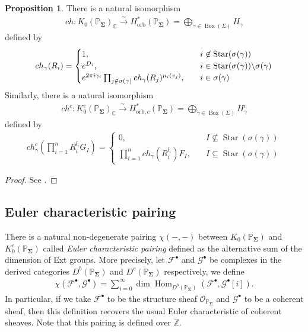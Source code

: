 \documentclass[11pt,reqno]{amsart}
\def\CC {{\mathbb C}}
\def\Z {{\mathbb Z}}
\def\PP {{\mathbb P}}
\theoremstyle{definition}
\newtheorem{proposition}[theorem]{Proposition}
\numberwithin{equation}{section}
\begin{document}
\smallskip



\begin{proposition}
	There is a natural isomorphism
	\begin{align*}
		ch: K_0(\PP_{\mathbf{\Sigma}})_{\CC}\xrightarrow{\sim} H_{\mathrm{orb}}^*(\PP_{\mathbf{\Sigma}})=\bigoplus_{\gamma\in\operatorname{Box}(\Sigma)}H_\gamma
	\end{align*}
	defined by
	\begin{align*}
		ch_{\gamma}(R_i)=\begin{cases}
1,\quad & i\not\in\operatorname{Star}(\sigma(\gamma)) \\
e^{D_i},\quad &i\in\operatorname{Star}(\sigma(\gamma))\backslash\sigma(\gamma) \\
e^{2\pi{\rm i}\gamma_i}\prod_{j\not\in\sigma(\gamma)}ch_{\gamma}(R_j)^{\mu_i(v_j)},\quad & i\in\sigma(\gamma)
\end{cases}
	\end{align*}
	Similarly, there is a natural isomorphism
	\begin{align*}
		ch^c: K_0^c(\PP_{\mathbf{\Sigma}})_{\CC}\xrightarrow{\sim} H_{\mathrm{orb},c}^*(\PP_{\mathbf{\Sigma}})=\bigoplus_{\gamma\in\operatorname{Box}(\Sigma)}H_\gamma^c
	\end{align*}
	defined by
	\begin{align*}
		ch_{\gamma}^c(\prod_{i=1}^n R_i^{l_i}G_I)=\begin{cases}
0,\quad & I\not\subseteq \operatorname{Star}(\sigma(\gamma)) \\
\prod_{i=1}^n ch_{\gamma}(R_i^{l_i})F_I,\quad &I \subseteq \operatorname{Star}(\sigma(\gamma)) 
\end{cases}
	\end{align*}
\end{proposition}
\begin{proof}
	See \cite[Proposition 3.7, 3.11]{BHconj}.
\end{proof}


\subsection{Euler characteristic pairing}

There is a natural non-degenerate pairing $\chi(-,-)$ between $K_0(\PP_{\mathbf{\Sigma}})$ and $K_0^c(\PP_{\mathbf{\Sigma}})$ called {\it Euler characteristic pairing} defined as the alternative sum of the dimension of Ext groups. More precisely, let $\mathcal{F}^{\bullet}$ and $\mathcal{G}^{\bullet}$ be complexes in the derived categories $D^b(\PP_{\mathbf{\Sigma}})$ and $D^c(\PP_{\mathbf{\Sigma}})$ respectively, we define
\begin{align*}
	\chi(\mathcal{F}^{\bullet},\mathcal{G}^{\bullet})=\sum_{i=0}^{\infty}\dim \operatorname{Hom}_{D^b(\PP_{\mathbf{\Sigma}})}(\mathcal{F}^{\bullet},\mathcal{G}^{\bullet}[i]).
\end{align*}
In particular, if we take $\mathcal{F}^{\bullet}$ to be the structure sheaf $\mathcal{O}_{\PP_{\mathbf{\Sigma}}}$ and $\mathcal{G}^{\bullet}$ to be a coherent sheaf, then this definition recovers the usual Euler characteristic of coherent sheaves. Note that this pairing is defined over $\Z$.
\end{document}
